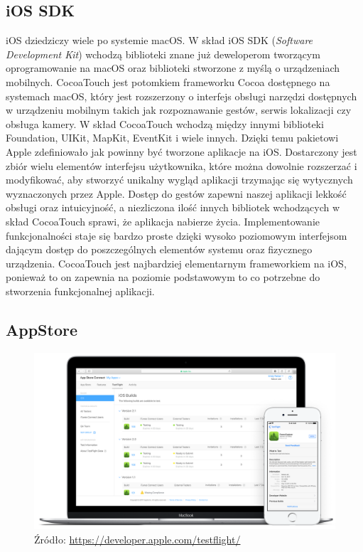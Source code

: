 \documentclass{article}
\begin{document}
\subsection*{iOS SDK}
iOS dziedziczy wiele po systemie macOS\@. W skład iOS SDK (\textit{Software Development 
Kit}) wchodzą biblioteki znane już deweloperom tworzącym oprogramowanie na macOS
oraz biblioteki stworzone z myślą o urządzeniach mobilnych. CocoaTouch jest potomkiem 
frameworku Cocoa dostępnego na systemach macOS, który jest rozszerzony o interfejs 
obsługi narzędzi dostępnych w urządzeniu mobilnym takich jak rozpoznawanie gestów,
serwis lokalizacji czy obsługa kamery. W skład CocoaTouch wchodzą między innymi
biblioteki Foundation, UIKit, MapKit, EventKit i wiele innych. Dzięki temu pakietowi
Apple zdefiniowało jak powinny być tworzone aplikacje na iOS\@. Dostarczony jest 
zbiór wielu elementów interfejsu użytkownika, które można dowolnie rozszerzać i
modyfikować, aby stworzyć unikalny wygląd aplikacji trzymając się wytycznych
wyznaczonych przez Apple. Dostęp do gestów zapewni naszej aplikacji lekkość obsługi
oraz intuicyjność, a niezliczona ilość innych bibliotek wchodzących w skład
CocoaTouch sprawi, że aplikacja nabierze życia. Implementowanie funkcjonalności staje
się bardzo proste dzięki wysoko poziomowym interfejsom dającym dostęp do
poszczególnych elementów systemu oraz fizycznego urządzenia. CocoaTouch jest 
najbardziej elementarnym frameworkiem na iOS, ponieważ to on zapewnia na poziomie
podstawowym to co potrzebne do stworzenia funkcjonalnej aplikacji. 

\subsection*{AppStore}

\begin{figure}[h]
\centering
\includegraphics[width=12cm]{testflight-overview-hero-large_2x}
\caption{Źródło: \url{https://developer.apple.com/testflight/}}
\end{figure}
\end{document}

